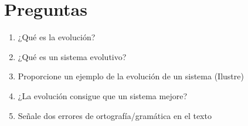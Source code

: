\documentclass[12pt]{article}
\title{}
\author{Instituto Politécnico Nacional\\Escuela Superior de Computo\\Bioinformatics\\Gonzalez Pardo Adrian\\Rosas Trigueros Jorge Luis\\El concepto de Evolución\\Relase date: \today}
\date{Delivery date: August 23rd, 2021}
\begin{document}
\maketitle
\section{Preguntas}
\begin{enumerate}
  \item ¿Qué es la evolución?
  \item ¿Qué es un sistema evolutivo?
  \item Proporcione un ejemplo de la evolución de un sistema (Ilustre)
  \item ¿La evolución consigue que un sistema mejore?
  \item Señale dos errores de ortografía/gramática en el texto
\end{enumerate}
\end{document}
